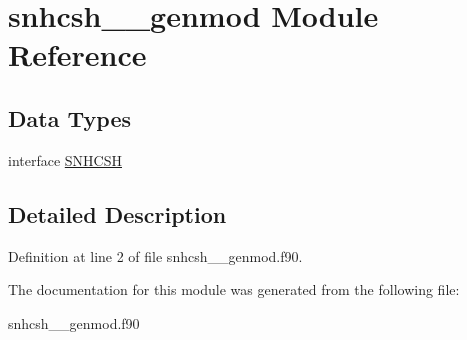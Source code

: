 \hypertarget{classsnhcsh____genmod}{\section{snhcsh\+\_\+\+\_\+genmod Module Reference}
\label{classsnhcsh____genmod}
}
\subsection*{Data Types}
\begin{DoxyCompactItemize}
\item 
interface \hyperlink{interfacesnhcsh____genmod_1_1_s_n_h_c_s_h}{S\+N\+H\+C\+S\+H}
\end{DoxyCompactItemize}


\subsection{Detailed Description}


Definition at line 2 of file snhcsh\+\_\+\+\_\+genmod.\+f90.



The documentation for this module was generated from the following file\+:\begin{DoxyCompactItemize}
\item 
snhcsh\+\_\+\+\_\+genmod.\+f90\end{DoxyCompactItemize}
